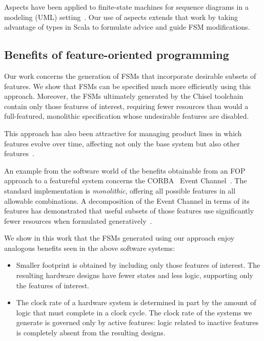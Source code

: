 \documentclass[sigplan,anonymous, review]{acmart}
\begin{document}
Aspects have been applied to finite-state machines for sequence diagrams in a modeling (UML) setting~\cite{aspectsUML}.  Our use of aspects extends that work by taking advantage of types in Scala to formulate advice and guide FSM modifications. 

\subsection{Benefits of feature-oriented programming}\label{sec:benefop}

Our work concerns the generation of FSMs that incorporate desirable subsets of features.  We show that FSMs can be specified much more efficiently using this approach.  Moreover, the FSMs ultimately generated by the Chisel toolchain contain only those features of interest, requiring fewer resources than would a full-featured, monolithic specification whose undesirable features are disabled.

This approach has also been attractive for managing product lines in which features evolve over time, affecting not only the base system but also other features~\cite{10.1145/2897695.2897701}. 

An example from the software world of the benefits obtainable from an FOP approach to a featureful system concerns the CORBA~\cite{CORBA:00} Event Channel~\cite{CORBAService:02a}. The standard implementation is \emph{monolithic}, offering all possible features in all allowable combinations.  A decomposition of the Event Channel in terms of its features has demonstrated that useful subsets of those features use significantly fewer resources when formulated generatively~\cite{Pratap:04}.   

We show in this work that the FSMs generated using our approach enjoy analogous benefits seen in the above software systems:
\begin{itemize}
    \item Smaller footprint is obtained by including only those features of interest.  The resulting hardware designs have fewer states and less logic, supporting only the features of interest.
    \item The clock rate of a hardware system is determined in part by the amount of logic that must complete in a clock cycle.   The clock rate of the systems we generate is governed only by active features:  logic related to inactive features is completely absent from the resulting designs.
\end{itemize}
\end{document}
